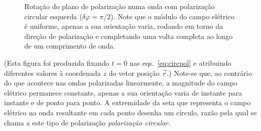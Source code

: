 \begin{description}[leftmargin=0pt,labelindent=0pt]
\begin{figure}[htb]
{\par
}
\caption{Rotação do plano de polarização numa onda com polarização circular
esquerda ($\delta\varphi=\pi/2$).  Note que o módulo do campo elétrico é
uniforme, apenas a sua orientação varia, rodando em torno da direção de
polarização e completando uma volta completa ao longo de um comprimento de onda. 
\label{fig:circpol}}
\end{figure}
(Esta figura foi produzida fixando $t=0$ nas eqs.~\eqref{eq:circpol} e
atribuindo diferentes valores à coordenada $z$ do vetor posição $\vec r$.)
Note-se que, ao contrário do que acontece nas ondas polarizadas linearmente, a
magnitude do campo elétrico permanece constante, apenas a sua orientação varia
de instante para instante e de ponto para ponto. A extremidade da seta que
representa o campo elétrico na onda resultante em cada ponto desenha um círculo,
razão pela qual se chama a este tipo de polarização \emph{polarização circular.}


\end{description}
